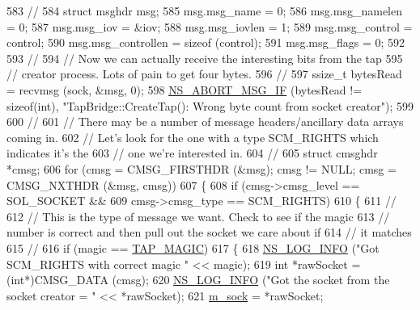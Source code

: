 \begin{DoxyCode}
583       \textcolor{comment}{//}
584       \textcolor{keyword}{struct }msghdr msg;
585       msg.msg\_name = 0;
586       msg.msg\_namelen = 0;
587       msg.msg\_iov = &iov;
588       msg.msg\_iovlen = 1;
589       msg.msg\_control = control;
590       msg.msg\_controllen = \textcolor{keyword}{sizeof} (control);
591       msg.msg\_flags = 0;
592 
593       \textcolor{comment}{//}
594       \textcolor{comment}{// Now we can actually receive the interesting bits from the tap}
595       \textcolor{comment}{// creator process.  Lots of pain to get four bytes.}
596       \textcolor{comment}{//}
597       ssize\_t bytesRead = recvmsg (sock, &msg, 0);
598       \hyperlink{group__fatal_ga6653324225bc139e46deea177614ceee}{NS\_ABORT\_MSG\_IF} (bytesRead != \textcolor{keyword}{sizeof}(\textcolor{keywordtype}{int}), \textcolor{stringliteral}{"TapBridge::CreateTap(): Wrong byte count
       from socket creator"});
599 
600       \textcolor{comment}{//}
601       \textcolor{comment}{// There may be a number of message headers/ancillary data arrays coming in.}
602       \textcolor{comment}{// Let's look for the one with a type SCM\_RIGHTS which indicates it's the}
603       \textcolor{comment}{// one we're interested in.}
604       \textcolor{comment}{//}
605       \textcolor{keyword}{struct }cmsghdr *cmsg;
606       \textcolor{keywordflow}{for} (cmsg = CMSG\_FIRSTHDR (&msg); cmsg != NULL; cmsg = CMSG\_NXTHDR (&msg, cmsg))
607         \{
608           \textcolor{keywordflow}{if} (cmsg->cmsg\_level == SOL\_SOCKET &&
609               cmsg->cmsg\_type == SCM\_RIGHTS)
610             \{
611               \textcolor{comment}{//}
612               \textcolor{comment}{// This is the type of message we want.  Check to see if the magic }
613               \textcolor{comment}{// number is correct and then pull out the socket we care about if}
614               \textcolor{comment}{// it matches}
615               \textcolor{comment}{//}
616               \textcolor{keywordflow}{if} (magic == \hyperlink{tap-bridge_8cc_af9ac95d538205da6013d79a63fee2bd7}{TAP\_MAGIC})
617                 \{
618                   \hyperlink{group__logging_gafbd73ee2cf9f26b319f49086d8e860fb}{NS\_LOG\_INFO} (\textcolor{stringliteral}{"Got SCM\_RIGHTS with correct magic "} << magic);
619                   \textcolor{keywordtype}{int} *rawSocket = (\textcolor{keywordtype}{int}*)CMSG\_DATA (cmsg);
620                   \hyperlink{group__logging_gafbd73ee2cf9f26b319f49086d8e860fb}{NS\_LOG\_INFO} (\textcolor{stringliteral}{"Got the socket from the socket creator = "} << *rawSocket);
621                   \hyperlink{classns3_1_1TapBridge_a52d87d41aa840377feebe63b5c5f2f3c}{m\_sock} = *rawSocket;

\end{DoxyCode}
